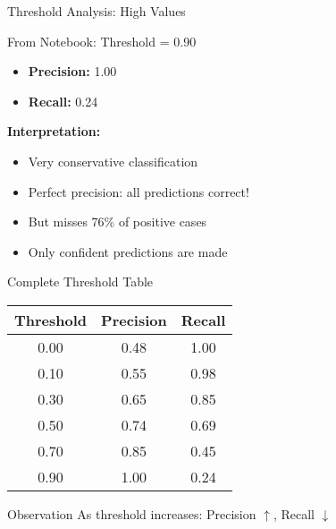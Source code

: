 \documentclass{beamer}
\begin{document}
\begin{frame}{Threshold Analysis: High Values}
\begin{examplebox}{From Notebook: Threshold = 0.90}
\begin{itemize}
    \item \textbf{Precision:} 1.00
    \item \textbf{Recall:} 0.24
\end{itemize}

\vspace{0.2cm}

\textbf{Interpretation:}
\begin{itemize}
    \item Very conservative classification
    \item Perfect precision: all predictions correct!
    \item But misses 76\% of positive cases
    \item Only confident predictions are made
\end{itemize}
\end{examplebox}
\end{frame}

\begin{frame}{Complete Threshold Table}
\begin{center}
\small
\begin{tabular}{|c|c|c|}
\hline
\textbf{Threshold} & \textbf{Precision} & \textbf{Recall} \\
\hline
0.00 & 0.48 & 1.00 \\
\hline
0.10 & 0.55 & 0.98 \\
\hline
0.30 & 0.65 & 0.85 \\
\hline
0.50 & 0.74 & 0.69 \\
\hline
0.70 & 0.85 & 0.45 \\
\hline
0.90 & 1.00 & 0.24 \\
\hline
\end{tabular}
\end{center}

\vspace{0.3cm}

\begin{keypointsbox}{Observation}
As threshold increases: Precision $\uparrow$, Recall $\downarrow$
\end{keypointsbox}
\end{frame}
\end{document}
